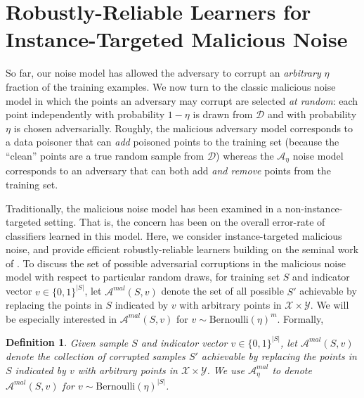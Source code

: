 \documentclass[11pt]{article}
\newtheorem{definition}{Definition}
\newcommand{\0}{\mathbf{0}}
\newcommand{\1}{\mathbf{1}}
\newcommand{\cA}{\mathcal{A}}
\newcommand{\cD}{\mathcal{D}}
\newcommand{\cY}{\mathcal{Y}}
\newcommand{\cX}{\mathcal{X}}
\begin{document}
\section{Robustly-Reliable Learners for Instance-Targeted Malicious Noise}\label{sec:malicious}
So far, our noise model has allowed the adversary to corrupt an {\em arbitrary} $\eta$ fraction of the training examples.  We now turn to the classic malicious noise model \citep{valiant1985learning,kearns1993learning} in which the points an adversary may corrupt are selected {\em at random}: each point independently with probability $1-\eta$ is drawn from $\cD$ and with probability $\eta$ is chosen adversarially.  Roughly, the malicious adversary model corresponds to a data poisoner that can {\em add} poisoned points to the training set (because the ``clean'' points are a true random sample from $\cD$) whereas the $\cA_\eta$ noise model corresponds to an adversary that can both add {\em and remove} points from the training set.

Traditionally, the malicious noise model has been examined in a non-instance-targeted setting. That is, the concern has been on the overall error-rate of classifiers learned in this model.
Here, we consider instance-targeted malicious noise, and provide efficient robustly-reliable learners building on the seminal work of \cite{awasthi2017power}.
To discuss the set of possible adversarial corruptions in the malicious noise model with respect to particular random draws, for training set $S$ and indicator vector $v \in \{0,1\}^{|S|}$, let $\cA^{mal}(S,v)$ denote the set of all possible $S'$ achievable by replacing the points in $S$ indicated by $v$ with arbitrary points in $\cX \times \cY$.
We will be especially interested in $\cA^{mal}(S,v)$ for $v \sim \mbox{Bernoulli}(\eta)^m$.  Formally,

\begin{definition}
Given sample $S$ and indicator vector $v \in \{0,1\}^{|S|}$, let $\cA^{mal}(S,v)$ denote the collection of corrupted samples $S'$ achievable by replacing the points in $S$ indicated by $v$ with arbitrary points in $\cX \times \cY$.  We use $\cA^{mal}_\eta$ to denote $\cA^{mal}(S,v)$ for $v \sim \mbox{Bernoulli}(\eta)^{|S|}$.
\end{definition}
\end{document}
